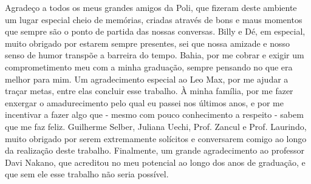 \begin{agradecimentos}

Agradeço a todos os meus grandes amigos da Poli, que fizeram deste ambiente um lugar especial cheio de memórias, criadas através de bons e maus momentos que sempre são o ponto de partida das nossas conversas. Billy e Dé, em especial, muito obrigado por estarem sempre presentes, sei que nossa amizade e nosso senso de humor transpõe a barreira do tempo. Bahia, por me cobrar e exigir um comprometimento meu com a minha graduação, sempre pensando no que era melhor para mim. Um agradecimento especial ao Leo Max, por me ajudar a traçar metas, entre elas concluir esse trabalho. À minha família, por me fazer enxergar o amadurecimento pelo qual eu passei nos últimos anos, e por me incentivar a fazer algo que - mesmo com pouco conhecimento a respeito -  sabem que me faz feliz. Guilherme Selber, Juliana Uechi, Prof. Zancul e Prof. Laurindo, muito obrigado por serem extremamente solícitos e conversarem comigo ao longo da realização deste trabalho. Finalmente, um grande agradecimento ao professor Davi Nakano, que acreditou no meu potencial ao longo dos anos de graduação, e que sem ele esse trabalho não seria possível.

\end{agradecimentos}